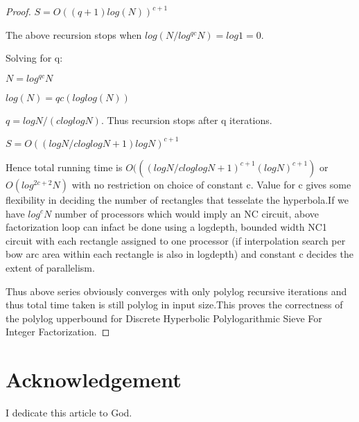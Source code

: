 \documentclass[11pt,onecolumn]{article}
\begin{document}
\begin{proof}
$S = O((q+1)log(N))^{c+1}$

The above recursion stops when $log(N/log^{qc}N) = log 1 = 0$.

Solving for q:

$N = log^{qc}N$

$log(N) = qc(loglog(N))$

$q = logN/(cloglogN)$. Thus recursion stops after q iterations.

$S = O((logN/cloglogN + 1)logN)^{c+1}$

Hence total running time is $O(((logN/cloglogN + 1)^{c+1}(logN)^{c+1})$ or $O(log^{2c+2}N)$ with no restriction on choice of constant c. Value for c gives some flexibility in deciding the number of rectangles that tesselate the hyperbola.If we have $log^{c}N$ number of processors which would imply an NC circuit, above factorization loop can infact be done using a logdepth, bounded width NC1 circuit with each rectangle assigned to one processor (if interpolation search per bow arc area within each rectangle is also in logdepth) and constant c decides the extent of parallelism.


Thus above series obviously converges with only polylog recursive iterations and thus total time taken is still polylog in input size.This proves the correctness of the polylog upperbound for Discrete Hyperbolic Polylogarithmic Sieve For Integer Factorization.

\end{proof}
\section{Acknowledgement}
I dedicate this article to God.
\end{document}

